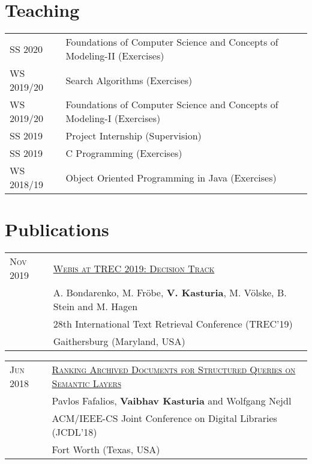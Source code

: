 \documentclass[a4paper,10pt]{article} %
\begin{document}

\section{Teaching}

\begin{tabular}{ll}
\textsc{SS 2020} & Foundations of Computer Science and Concepts of Modeling-II (Exercises)\\
\textsc{WS 2019/20} & Search Algorithms (Exercises)\\
\textsc{WS 2019/20} & Foundations of Computer Science and Concepts of Modeling-I (Exercises)\\
\textsc{SS 2019} & Project Internship (Supervision)\\
\textsc{SS 2019} & C Programming (Exercises)\\
\textsc{WS 2018/19} & Object Oriented Programming in Java (Exercises)\\

\end{tabular}


\section{Publications}

\begin{tabular}{ll}
\textsc{Nov 2019} & \href{https://webis.de/downloads/publications/papers/stein_2019zc.pdf}{\textsc{Webis at TREC 2019: Decision Track}}\\
& A. Bondarenko, M. Fröbe, \textbf{V. Kasturia}, M. Völske, B. Stein and M. Hagen \\
& 28th International Text Retrieval Conference (TREC'19)\\
& Gaithersburg (Maryland, USA)\\
\end{tabular}

\begin{tabular}{ll}
\textsc{Jun 2018} & \href{https://dl.acm.org/doi/10.1145/3197026.3197049}{\textsc{Ranking Archived Documents for Structured Queries on Semantic Layers}}\\
& Pavlos Fafalios, \textbf{Vaibhav Kasturia} and Wolfgang Nejdl\\
& ACM/IEEE-CS Joint Conference on Digital Libraries (JCDL’18)\\
& Fort Worth (Texas, USA)\\
\end{tabular}
\end{document}
